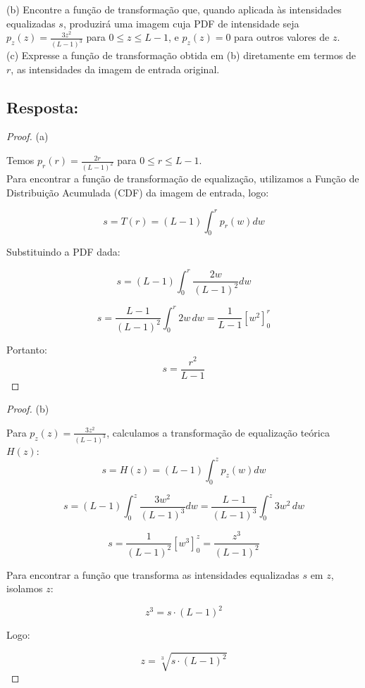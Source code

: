 \documentclass[a4paper,12pt]{article}
\begin{document}
(b) Encontre a função de transformação que, quando aplicada às intensidades equalizadas $s$, produzirá
uma imagem cuja PDF de intensidade seja $p_{z}(z) = \frac{3z^2}{(L-1)^3}$ para $0 \leq z \leq L-1$, e $p_{z}(z) = 0$ para
outros valores de $z$.\\

(c) Expresse a função de transformação obtida em (b) diretamente em termos de $r$, as intensidades da
imagem de entrada original.


\subsection*{Resposta:}

\bigskip

\begin{proof}

(a)

Temos $p_{r}(r) = \frac{2r}{(L-1)^2}$ para $0 \leq r \leq L-1$.\\

Para encontrar a função de transformação de equalização, utilizamos a Função de Distribuição Acumulada (CDF) da imagem de entrada, 
logo:

$$s = T(r) = (L-1) \int_{0}^{r} p_{r}(w) dw$$

Substituindo a PDF dada:

$$s = (L-1) \int_{0}^{r} \frac{2w}{(L-1)^2} dw$$

$$s = \frac{L-1}{(L-1)^2} \int_{0}^{r} 2w \, dw = \frac{1}{L-1} \left[ w^2 \right]_0^r$$

Portanto:
$$s = \frac{r^2}{L-1}$$

\end{proof}

\begin{proof}

(b) 

Para $p_{z}(z) = \frac{3z^2}{(L-1)^3}$, calculamos a transformação de equalização teórica $H(z)$:\\


$$s = H(z) = (L-1) \int_{0}^{z} p_{z}(w) dw$$

$$s = (L-1) \int_{0}^{z} \frac{3w^2}{(L-1)^3} dw = \frac{L-1}{(L-1)^3} \int_{0}^{z} 3w^2 \, dw$$

$$s = \frac{1}{(L-1)^2} \left[ w^3 \right]_0^z = \frac{z^3}{(L-1)^2}$$

Para encontrar a função que transforma as intensidades equalizadas $s$ em $z$, isolamos $z$:


$$z^3 = s \cdot (L-1)^2$$

Logo: 

$$z = \sqrt[3]{s \cdot (L-1)^2}$$

\end{proof}
\end{document}
